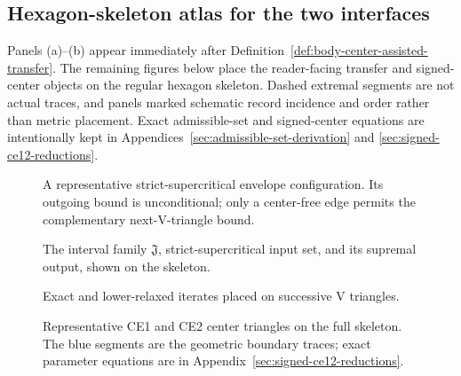 \subsection{Hexagon-skeleton atlas for the two interfaces}
\label{sec:interface-notation-atlas}

Panels (a)--(b) appear immediately after
Definition~\ref{def:body-center-assisted-transfer}.  The remaining figures
below place the reader-facing transfer and signed-center objects on the regular
hexagon skeleton.  Dashed extremal segments are not actual traces, and panels
marked schematic record incidence and order rather than metric placement.
Exact admissible-set and signed-center equations are intentionally kept in
Appendices~\ref{sec:admissible-set-derivation} and
\ref{sec:signed-ce12-reductions}.

\begin{figure}[H]
\centering
\resizebox{.90\linewidth}{!}{}
\caption{A representative strict-supercritical envelope configuration.  Its
outgoing bound is unconditional; only a center-free edge permits the
complementary next-V-triangle bound.}
\label{fig:transfer-supercritical-skeleton}
\end{figure}

\begin{figure}[H]
\centering
\resizebox{.96\linewidth}{!}{%
}
\caption{The interval family $\mathfrak J$, strict-supercritical input set, and
its supremal output, shown on the skeleton.}
\label{fig:strategy2-transfer-domains-skeleton}
\end{figure}

\begin{figure}[H]
\centering
\resizebox{.86\linewidth}{!}{}
\caption{Exact and lower-relaxed iterates placed on successive V triangles.}
\label{fig:relaxed-composition-skeleton}
\end{figure}

\begin{figure}[H]
\centering
\resizebox{.99\linewidth}{!}{}
\caption{Representative CE1 and CE2 center triangles on the full skeleton.
The blue segments are the geometric boundary traces; exact parameter equations
are in Appendix~\ref{sec:signed-ce12-reductions}.}
\label{fig:signed-center-samples-skeleton}
\end{figure}
